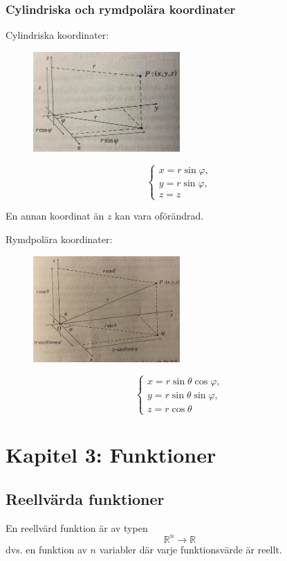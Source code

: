 \documentclass[a4paper,12pt]{article}
\begin{document}
\subsubsection*{Cylindriska och rymdpolära koordinater}
Cylindriska koordinater:
\begin{figure}[H]
  \centering
  \includegraphics[width=0.5\textwidth]{cylindriskakoordinater.png}
\end{figure}
\[
\begin{cases}
x = r \sin \varphi, \\
y = r \sin \varphi, \\
z = z
\end{cases}
\]

En annan koordinat än $z$ kan vara oförändrad.

Rymdpolära koordinater:
\begin{figure}[H]
  \centering
  \includegraphics[width=0.5\textwidth]{rymdpolarakoordinater.png}
\end{figure}
\[
\begin{cases}
x = r \sin \theta \cos \varphi, \\
y = r \sin \theta \sin \varphi, \\
z = r \cos \theta
\end{cases}
\]

\section{Kapitel 3: Funktioner}

\subsection{Reellvärda funktioner}
En reellvärd funktion är av typen
\[
\mathbb{R}^n \to \mathbb{R}
\]
dvs. en funktion av $n$ variabler där varje funktionsvärde är reellt.
\end{document}
